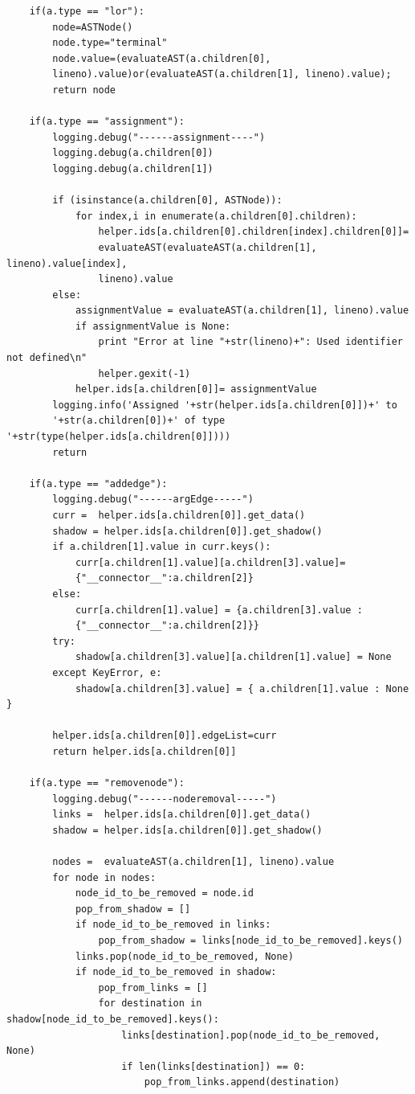 \documentclass[a4paper]{article}
\begin{document}
\begin{verbatim}
    if(a.type == "lor"):
        node=ASTNode()
        node.type="terminal"
        node.value=(evaluateAST(a.children[0], 
        lineno).value)or(evaluateAST(a.children[1], lineno).value);
        return node

    if(a.type == "assignment"):
        logging.debug("------assignment----")
        logging.debug(a.children[0])
        logging.debug(a.children[1])
    
        if (isinstance(a.children[0], ASTNode)):
            for index,i in enumerate(a.children[0].children):
                helper.ids[a.children[0].children[index].children[0]]= 
                evaluateAST(evaluateAST(a.children[1], lineno).value[index], 
                lineno).value                
        else:
            assignmentValue = evaluateAST(a.children[1], lineno).value
            if assignmentValue is None:
                print "Error at line "+str(lineno)+": Used identifier not defined\n"
                helper.gexit(-1)
            helper.ids[a.children[0]]= assignmentValue
        logging.info('Assigned '+str(helper.ids[a.children[0]])+' to 
        '+str(a.children[0])+' of type '+str(type(helper.ids[a.children[0]])))
        return

    if(a.type == "addedge"):
        logging.debug("------argEdge-----")
        curr =  helper.ids[a.children[0]].get_data()
        shadow = helper.ids[a.children[0]].get_shadow()
        if a.children[1].value in curr.keys():
            curr[a.children[1].value][a.children[3].value]=
            {"__connector__":a.children[2]}
        else:
            curr[a.children[1].value] = {a.children[3].value : 
            {"__connector__":a.children[2]}}
        try:
            shadow[a.children[3].value][a.children[1].value] = None
        except KeyError, e:
            shadow[a.children[3].value] = { a.children[1].value : None }
        
        helper.ids[a.children[0]].edgeList=curr
        return helper.ids[a.children[0]]

    if(a.type == "removenode"):
        logging.debug("------noderemoval-----")
        links =  helper.ids[a.children[0]].get_data()
        shadow = helper.ids[a.children[0]].get_shadow()

        nodes =  evaluateAST(a.children[1], lineno).value
        for node in nodes:
            node_id_to_be_removed = node.id
            pop_from_shadow = []
            if node_id_to_be_removed in links:
                pop_from_shadow = links[node_id_to_be_removed].keys()
            links.pop(node_id_to_be_removed, None)
            if node_id_to_be_removed in shadow:
                pop_from_links = [] 
                for destination in shadow[node_id_to_be_removed].keys():
                    links[destination].pop(node_id_to_be_removed, None)
                    if len(links[destination]) == 0:
                        pop_from_links.append(destination)
    

\end{verbatim}
\end{document}
